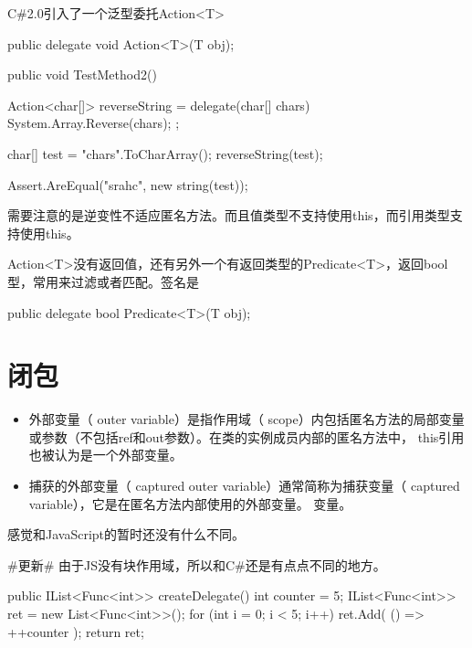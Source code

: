 C\#2.0引入了一个泛型委托Action<T>

\begin{CSharp}
		public delegate void Action<T>(T obj);
\end{CSharp}


\begin{CSharp}[Action和匿名方法]
        [TestMethod]
        public void TestMethod2()
        {
            Action<char[]> reverseString = delegate(char[] chars){
                System.Array.Reverse(chars);
            };

            char[] test = "chars".ToCharArray();
            reverseString(test);

            Assert.AreEqual("srahc", new string(test));

        }
\end{CSharp}

需要注意的是逆变性不适应匿名方法。而且值类型不支持使用this，而引用类型支持使用this。


Action<T>没有返回值，还有另外一个有返回类型的Predicate<T>，返回bool型，常用来过滤或者匹配。签名是
\begin{CSharp}
		public delegate bool Predicate<T>(T obj);
\end{CSharp}

\section{闭包}
\begin{itemize}
\item 外部变量（ outer variable）是指作用域（ scope）内包括匿名方法的局部变量或参数（不包括ref和out参数）。在类的实例成员内部的匿名方法中， this引用也被认为是一个外部变量。
\item 捕获的外部变量（ captured outer variable）通常简称为捕获变量（ captured variable），它是在匿名方法内部使用的外部变量。
变量。
\end{itemize}

感觉和JavaScript的暂时还没有什么不同。


\#更新\#
由于JS没有块作用域，所以和C\#还是有点点不同的地方。

\begin{CSharp}
        public IList<Func<int>> createDelegate()
        {
            int counter = 5;
            IList<Func<int>> ret = new List<Func<int>>();
            for (int i = 0; i < 5; i++)
            {
                ret.Add( () => ++counter );
            }
            return ret; 
        }
\end{CSharp}

